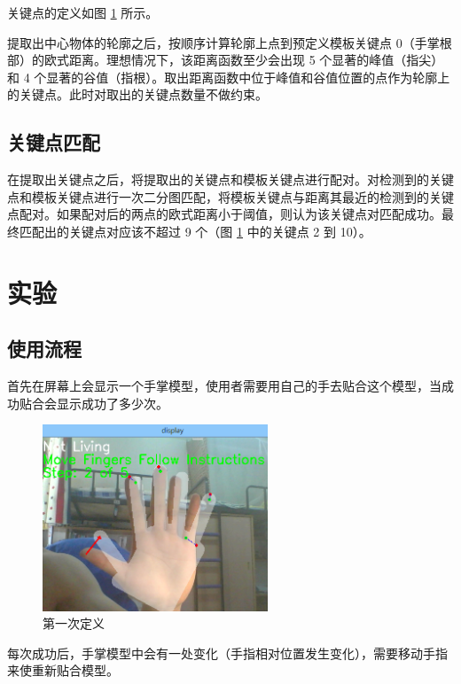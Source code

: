 \documentclass[UTF8, a4paper, fontset=none]{article}
\begin{document}
关键点的定义如图 \ref{hand} 所示。

提取出中心物体的轮廓之后，按顺序计算轮廓上点到预定义模板关键点 0（手掌根部）的欧式距离。理想情况下，该距离函数至少会出现 5 个显著的峰值（指尖）和 4 个显著的谷值（指根）。取出距离函数中位于峰值和谷值位置的点作为轮廓上的关键点。此时对取出的关键点数量不做约束。

\subsection{关键点匹配}

在提取出关键点之后，将提取出的关键点和模板关键点进行配对。对检测到的关键点和模板关键点进行一次二分图匹配，将模板关键点与距离其最近的检测到的关键点配对。如果配对后的两点的欧式距离小于阈值，则认为该关键点对匹配成功。最终匹配出的关键点对应该不超过 9 个（图 \ref{hand} 中的关键点 2 到 10）。

\section{实验}

    \subsection{使用流程}
	
	首先在屏幕上会显示一个手掌模型，使用者需要用自己的手去贴合这个模型，当成功贴合会显示成功了多少次。
	
	\begin{figure}
    \centering
    \includegraphics[width=0.6\textwidth]{./test1.png}
    \caption{第一次定义}
    \label{hand}
	\end{figure}
	
	每次成功后，手掌模型中会有一处变化（手指相对位置发生变化），需要移动手指来使重新贴合模型。
	
\end{document}
